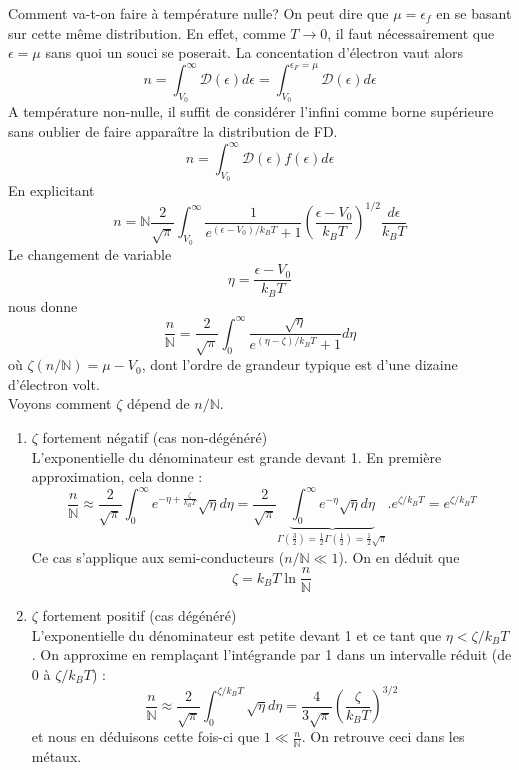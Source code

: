 Comment va-t-on faire à température nulle? On peut dire que 
$\mu = \epsilon_f$ en se basant sur cette même distribution. En 
effet, comme $T\rightarrow 0$, il faut nécessairement que $\epsilon
 = \mu$ sans quoi un souci se poserait. La concentation d'électron 
 vaut alors
\begin{equation}
n = \int_{V_0}^\infty \mathcal{D}(\epsilon)d\epsilon = 
\int_{V_0}^{\epsilon_F=\mu}\mathcal{D}(\epsilon)d\epsilon 
\end{equation}
A température non-nulle, il suffit de considérer l'infini comme borne 
supérieure sans oublier de faire apparaître la distribution de FD.
\begin{equation}
n = \int_{V_0}^\infty \mathcal{D}(\epsilon)f(\epsilon)d\epsilon
\end{equation}
En explicitant
\begin{equation}
n = \mathbb{N}\frac{2}{\sqrt{\pi}}\int_{V_0}^\infty \frac{1}{e^{
(\epsilon-V_0)/k_BT}+1}\left(\frac{\epsilon-V_0}{k_BT}\right)^{1/2
}\frac{d\epsilon}{k_BT}
\end{equation}
Le changement de variable
\begin{equation}
\eta = \frac{\epsilon - V_0}{k_BT}
\end{equation}
nous donne
\begin{equation}
\frac{n}{\mathbb{N}} = \frac{2}{\sqrt{\pi}}\int_0^\infty \dfrac{\sqrt
{\eta}}{e^{(\eta-\zeta)/k_BT}+1}d\eta
\end{equation}
où $\zeta(n/\mathbb{N}) = \mu - V_0$, dont l'ordre de grandeur typique 
est 
d'une dizaine d'électron volt.\\
Voyons comment $\zeta$ dépend de $n/\mathbb{N}$.
\begin{enumerate}
\item $\zeta$ fortement négatif (cas non-dégénéré)\\
L'exponentielle du dénominateur est grande devant 1. En première 
approximation, cela donne :
\begin{equation}
\frac{n}{\mathbb{N}} \approx \frac{2}{\sqrt{\pi}}\int_0^\infty e^{-
\eta + \frac{\zeta}{k_BT}}\sqrt{\eta}d\eta = \frac{2}{\sqrt{\pi}}
\underbrace{\int_0^\infty e^{-\eta} \sqrt{\eta}d\eta}_{\Gamma(\frac{3
}{2}) = \frac{1}{2}\Gamma(\frac{1}{2}) = \frac{1}{2}\sqrt{\pi}}.e^{
\zeta/k_BT} = e^{\zeta/k_BT}
\end{equation}
Ce cas s'applique aux semi-conducteurs ($n/\mathbb{N}\ll 1$). On en 
déduit que
\begin{equation}
\zeta = k_BT\ln\frac{n}{\mathbb{N}}
\end{equation}
\item $\zeta$ fortement positif (cas dégénéré)\\
L'exponentielle du dénominateur est petite devant 1 et ce tant que $
\eta < \zeta/k_BT$. On approxime en remplaçant l'intégrande par 1 dans 
un intervalle réduit (de 0 à $\zeta/k_BT$) :
\begin{equation}
\frac{n}{\mathbb{N}} \approx \frac{2}{\sqrt{\pi}}\int_0^{\zeta/k_BT} 
\sqrt{\eta}d\eta = \frac{4}{3\sqrt{\pi}}\left(\frac{\zeta}{k_BT}\right)^{
3/2}
\end{equation}
et nous en déduisons cette fois-ci que $1 \ll \frac{n}{\mathbb{N}}$. On 
retrouve ceci dans les métaux.
\end{enumerate}
